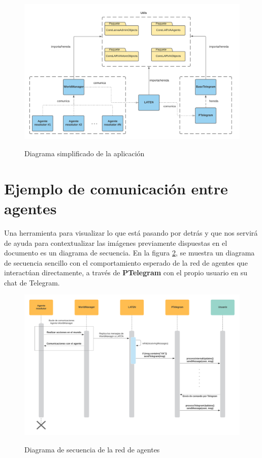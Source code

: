 \begin{figure}[h]
\centering
\includegraphics[width=1.1\textwidth]{logos/diagramaaplicacion.png}\\[1.4cm]
\caption{Diagrama simplificado de la aplicación}
\label{img:diagramaaplicacion}
\end{figure}

\section{Ejemplo de comunicación entre agentes}

Una herramienta para visualizar lo que está pasando por detrás y que nos servirá de ayuda para contextualizar las imágenes previamente dispuestas en el documento es un diagrama de secuencia. En la figura \ref{img:secuencia}, se muestra un diagrama de secuencia sencillo con el comportamiento esperado de la red de agentes que interactúan directamente, a través de \textbf{PTelegram} con el propio usuario en su chat de Telegram.

\begin{figure}[h]
\centering
\includegraphics[width=1.1\textwidth]{logos/secuencia.png}\\[1.4cm]
\caption{Diagrama de secuencia de la red de agentes}
\label{img:secuencia}
\end{figure}

